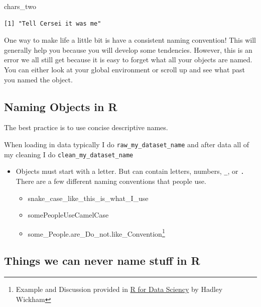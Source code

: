 \documentclass[
  letterpaper,
  DIV=11,
  numbers=noendperiod,
  oneside]{scrreprt}
\newenvironment{Shaded}{\begin{snugshade}}{\end{snugshade}}
\newcommand{\NormalTok}[1]{\textcolor[rgb]{0.00,0.23,0.31}{#1}}
\providecommand{\tightlist}{%
  \setlength{\itemsep}{0pt}\setlength{\parskip}{0pt}}\usepackage{longtable,booktabs,array}
\begin{document}
\begin{Shaded}
\begin{Highlighting}[]
\NormalTok{chars\_two}
\end{Highlighting}
\end{Shaded}

\begin{verbatim}
[1] "Tell Cersei it was me"
\end{verbatim}

One way to make life a little bit is have a consistent naming
convention! This will generally help you because you will develop some
tendencies. However, this is an error we all still get because it is
easy to forget what all your objects are named. You can either look at
your global environment or scroll up and see what past you named the
object.

\hypertarget{naming-objects-in-r}{%
\subsection{Naming Objects in R}\label{naming-objects-in-r}}

The best practice is to use concise descriptive names.

When loading in data typically I do \texttt{raw\_my\_dataset\_name} and
after data all of my cleaning I do \texttt{clean\_my\_dataset\_name}

\begin{itemize}
\tightlist
\item
  Objects must start with a letter. But can contain letters, numbers,
  \texttt{\_}, or \texttt{.} There are a few different naming
  conventions that people use.

  \begin{itemize}
  \tightlist
  \item
    snake\_case\_like\_this\_is\_what\_I\_use
  \item
    somePeopleUseCamelCase
  \item
    some\_People.are\_Do\_not.like\_Convention\footnote{Example and
      Discussion provided in
      \href{https://r4ds.had.co.nz/workflow-basics.html?q=snake\#\#whats-in-a-name}{R
      for Data Sciency} by Hadley Wickham}
  \end{itemize}
\end{itemize}

\hypertarget{things-we-can-never-name-stuff-in-r}{%
\subsection{Things we can never name stuff in
R}\label{things-we-can-never-name-stuff-in-r}}
\end{document}
